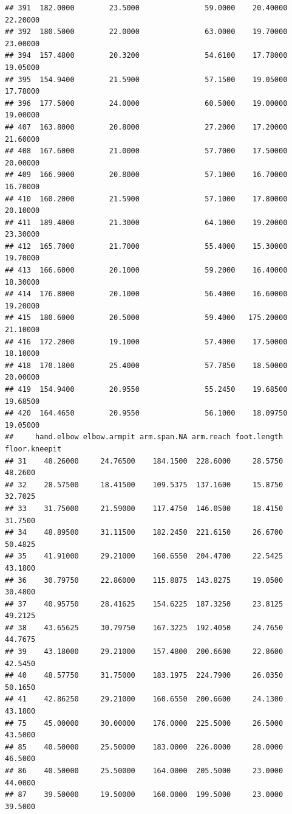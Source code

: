 \documentclass[]{article}
\begin{document}
\begin{verbatim}
## 391  182.0000        23.5000               59.0000    20.40000   22.20000
## 392  180.5000        22.0000               63.0000    19.70000   23.00000
## 394  157.4800        20.3200               54.6100    17.78000   19.05000
## 395  154.9400        21.5900               57.1500    19.05000   17.78000
## 396  177.5000        24.0000               60.5000    19.00000   19.00000
## 407  163.8000        20.8000               27.2000    17.20000   21.60000
## 408  167.6000        21.0000               57.7000    17.50000   20.00000
## 409  166.9000        20.8000               57.1000    16.70000   16.70000
## 410  160.2000        21.5900               57.1000    17.80000   20.10000
## 411  189.4000        21.3000               64.1000    19.20000   23.30000
## 412  165.7000        21.7000               55.4000    15.30000   19.70000
## 413  166.6000        20.1000               59.2000    16.40000   18.30000
## 414  176.8000        20.1000               56.4000    16.60000   19.20000
## 415  180.6000        20.5000               59.4000   175.20000   21.10000
## 416  172.2000        19.1000               57.4000    17.50000   18.10000
## 418  170.1800        25.4000               57.7850    18.50000   20.00000
## 419  154.9400        20.9550               55.2450    19.68500   19.68500
## 420  164.4650        20.9550               56.1000    18.09750   19.05000
##     hand.elbow elbow.armpit arm.span.NA arm.reach foot.length floor.kneepit
## 31    48.26000     24.76500    184.1500  228.6000     28.5750       48.2600
## 32    28.57500     18.41500    109.5375  137.1600     15.8750       32.7025
## 33    31.75000     21.59000    117.4750  146.0500     18.4150       31.7500
## 34    48.89500     31.11500    182.2450  221.6150     26.6700       50.4825
## 35    41.91000     29.21000    160.6550  204.4700     22.5425       43.1800
## 36    30.79750     22.86000    115.8875  143.8275     19.0500       30.4800
## 37    40.95750     28.41625    154.6225  187.3250     23.8125       49.2125
## 38    43.65625     30.79750    167.3225  192.4050     24.7650       44.7675
## 39    43.18000     29.21000    157.4800  200.6600     22.8600       42.5450
## 40    48.57750     31.75000    183.1975  224.7900     26.0350       50.1650
## 41    42.86250     29.21000    160.6550  200.6600     24.1300       43.1800
## 75    45.00000     30.00000    176.0000  225.5000     26.5000       43.5000
## 85    40.50000     25.50000    183.0000  226.0000     28.0000       46.5000
## 86    40.50000     25.50000    164.0000  205.5000     23.0000       44.0000
## 87    39.50000     19.50000    160.0000  199.5000     23.0000       39.5000

\end{verbatim}
\end{document}
